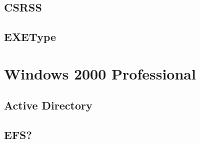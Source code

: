 	\subsection{CSRSS}
	\subsection{EXEType}

\section{Windows 2000 Professional}

	\subsection{Active Directory}
	\subsection{EFS?}

